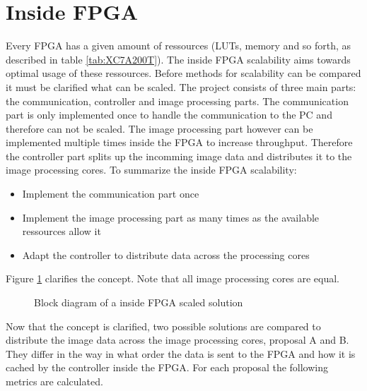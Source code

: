 \section{Inside FPGA} \label{chapt:sca:inside}
Every FPGA has a given amount of ressources (LUTs, memory and so forth, as
described in table \ref{tab:XC7A200T}). The inside FPGA scalability aims towards
optimal usage of these ressources. Before methods for scalability can be
compared it must be clarified what can be scaled. The project
consists of three main parts: the communication, controller and image processing
parts. The communication part is only implemented once to handle the
communication to the PC and therefore can not be scaled. The image processing
part however can be implemented multiple times inside the FPGA to increase
throughput. Therefore the controller part splits up the incomming image data and
distributes it to the image processing cores. To summarize the inside FPGA
scalability:
\begin{itemize}
    \item Implement the communication part once
    \item Implement the image processing part as many times as the available
    ressources allow it
    \item Adapt the controller to distribute data across the processing cores
\end{itemize}

Figure \ref{fig:insidefpgascaleconceptbd} clarifies the concept. Note that all
image processing cores are equal.

\begin{figure}[tb!]
    \centering
    \begin{adjustbox}{max height=5cm}
        
    \end{adjustbox}
    \caption{Block diagram of a inside FPGA scaled solution}
    \label{fig:insidefpgascaleconceptbd}
\end{figure}

Now that the concept is clarified, two possible solutions are compared to
distribute the image data across the image processing cores, proposal A and B.
They differ in the way in what order the data is sent to the FPGA and how it is
cached by the controller inside the FPGA. For each proposal the following
metrics are calculated.

